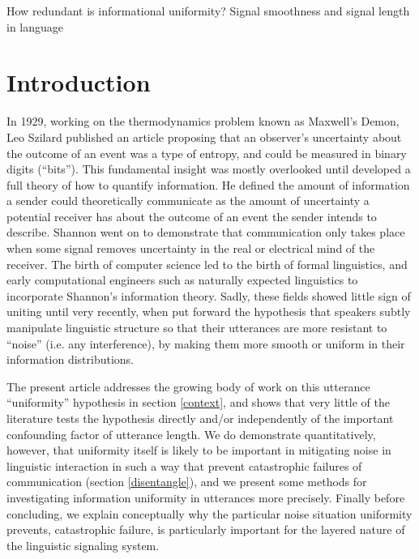 \documentclass[12pt]{article}
\begin{document}
\noindent How redundant is informational uniformity? Signal smoothness and signal length in language\\

\section{Introduction}

\nocite{shannon1948reprint}
In 1929, working on the thermodynamics problem known as Maxwell's Demon, Leo Szilard published an article proposing that an observer's uncertainty about the outcome of an event was a type of entropy, and could be measured in binary digits (``bits''). This fundamental insight was mostly overlooked until \citet{shannon1948} developed a full theory of how to quantify information. He defined the amount of information a sender could theoretically communicate as the amount of uncertainty a potential receiver has about the outcome of an event the sender intends to describe. Shannon went on to demonstrate that communication only takes place when some signal removes uncertainty in the real or electrical mind of the receiver. The birth of computer science led to the birth of formal linguistics, and early computational engineers such as \citet{pierce1980} naturally expected linguistics to incorporate Shannon's information theory. Sadly, these fields showed little sign of uniting until very recently, when \citet{aylettturk2004} put forward the hypothesis that speakers subtly manipulate linguistic structure so that their utterances are more resistant to ``noise'' (i.e. any interference), by making them more smooth or uniform in their information distributions.

The present article addresses the growing body of work on this utterance ``uniformity'' hypothesis in section \ref{context}, and shows that very little of the literature tests the hypothesis directly and/or independently of the important confounding factor of utterance length. We do demonstrate quantitatively, however, that uniformity itself is likely to be important in mitigating noise in linguistic interaction in such a way that prevent catastrophic failures of communication (section \ref{disentangle}), and we present some methods for investigating information uniformity in utterances more precisely. Finally before concluding, we explain conceptually why the particular noise situation uniformity prevents, catastrophic failure, is particularly important for the layered nature of the linguistic signaling system. 
\end{document}
